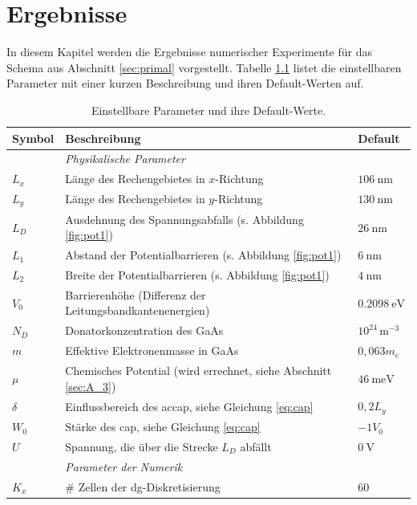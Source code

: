 \chapter{Ergebnisse}
In diesem Kapitel werden die Ergebnisse numerischer Experimente für das Schema aus Abschnitt \ref{sec:primal} vorgestellt. Tabelle \ref{tab:parameter} listet die einstellbaren Parameter mit einer kurzen Beschreibung und ihren Default-Werten auf.
\begin{table}
  \centering
  \caption{Einstellbare Parameter und ihre Default-Werte.}
  \label{tab:parameter}
  \scriptsize
  \begin{tabular}{p{} p{} p{}  }
    \toprule
    {Symbol} & Beschreibung & Default \\
    \midrule
       & \emph{Physikalische Parameter} & \\
    $L_x$ &Länge des Rechengebietes in $x$-Richtung & $\SI{106}{\nano\meter}$ \\
    $L_y$ &Länge des Rechengebietes in $y$-Richtung & $\SI{130}{\nano\meter}$ \\
    $L_D$ & Ausdehnung des Spannungsabfalls (s. Abbildung \ref{fig:pot1}) & $\SI{26}{\nano\meter}$\\
    $L_1$ & Abstand der Potentialbarrieren (s. Abbildung \ref{fig:pot1}) &$\SI{6}{\nano\meter}$ \\
    $L_2$ & Breite der Potentialbarrieren  (s. Abbildung \ref{fig:pot1}) &$\SI{4}{\nano\meter}$ \\
    $V_0$ & Barrierenhöhe (Differenz der Leitungsbandkantenenergien) &$\SI{0.2098}{\electronvolt}$ \\
    $N_D$ & Donatorkonzentration des GaAs & $10^{24}\,\text{m}^{-3}$ \\
    $m$ & Effektive Elektronenmasse in GaAs & $0,063 m_e$ \\
    $\mu$   & Chemisches Potential (wird errechnet, siehe Abschnitt \ref{sec:A_3}) & $\SI{46}{\milli\electronvolt}$ \\
    $\delta$ & Einflussbereich des ac{cap}, siehe Gleichung \eqref{eq:cap} & $0,2 L_y$\\
    $W_0$ & Stärke des \ac{cap}, siehe Gleichung \eqref{eq:cap} &$-1V_0$ \\
    $U$   &Spannung, die über die Strecke $L_D$ abfällt & $\SI{0}{\volt}$ \\
    \midrule
     & \emph{Parameter der Numerik} & \\
    $K_x$ & \# Zellen der \ac{dg}-Diskretisierung & 60 \\

\end{tabular}
\end{table}

